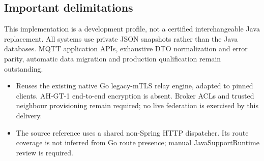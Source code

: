 \documentclass[a4paper]{arrowhead}
\begin{document}
\subsection{Important delimitations}
This implementation is a development profile, not a certified interchangeable Java replacement. All systems use private JSON snapshots rather than the Java databases. MQTT application APIs, exhaustive DTO normalization and error parity, automatic data migration and production qualification remain outstanding.
\begin{itemize}
\item Reuses the existing native Go legacy-mTLS relay engine, adapted to pinned clients. AH-GT-1 end-to-end encryption is absent. Broker ACLs and trusted neighbour provisioning remain required; no live federation is exercised by this delivery.
\item The source reference uses a shared non-Spring HTTP dispatcher. Its route coverage is not inferred from Go route presence; manual JavaSupportRuntime review is required.
\end{itemize}
\end{document}
